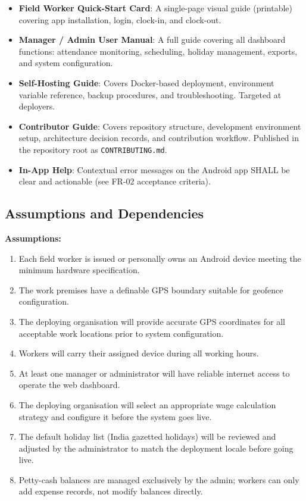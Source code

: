 \documentclass[12pt, a4paper]{article}
\begin{document}
\begin{itemize}
    \item \textbf{Field Worker Quick-Start Card}: A single-page visual
          guide (printable) covering app installation, login, clock-in,
          and clock-out.
    \item \textbf{Manager / Admin User Manual}: A full guide covering
          all dashboard functions: attendance monitoring, scheduling,
          holiday management, exports, and system configuration.
    \item \textbf{Self-Hosting Guide}: Covers Docker-based deployment,
          environment variable reference, backup procedures, and
          troubleshooting. Targeted at deployers.
    \item \textbf{Contributor Guide}: Covers repository structure,
          development environment setup, architecture decision records,
          and contribution workflow. Published in the repository root as
          \texttt{CONTRIBUTING.md}.
    \item \textbf{In-App Help}: Contextual error messages on the Android
          app SHALL be clear and actionable (see FR-02 acceptance
          criteria).
\end{itemize}

\subsection{Assumptions and Dependencies}

\textbf{Assumptions:}
\begin{enumerate}
    \item Each field worker is issued or personally owns an Android device
          meeting the minimum hardware specification.
    \item The work premises have a definable GPS boundary suitable for
          geofence configuration.
    \item The deploying organisation will provide accurate GPS coordinates
          for all acceptable work locations prior to system configuration.
    \item Workers will carry their assigned device during all working
          hours.
    \item At least one manager or administrator will have reliable internet
          access to operate the web dashboard.
    \item The deploying organisation will select an appropriate wage
          calculation strategy and configure it before the system goes
          live.
    \item The default holiday list (India gazetted holidays) will be
          reviewed and adjusted by the administrator to match the
          deployment locale before going live.
    \item Petty-cash balances are managed exclusively by the admin;
          workers can only add expense records, not modify balances
          directly.
\end{enumerate}
\end{document}
